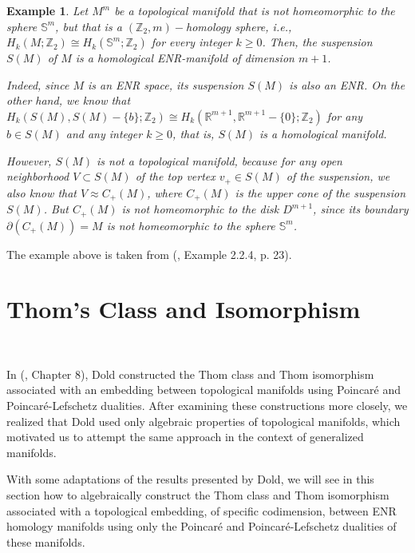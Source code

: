\documentclass[12pt,oneside]{book}
\newtheorem{ex}     {Example}[chapter]
\newcommand{\R}{\mathbb{R}}
\newcommand{\Z}{\mathbb{Z}}
\begin{document}
    \begin{ex}
        Let $M^{m}$ be a topological manifold that is not homeomorphic to the sphere $\mathbb{S}^{m}$, but that is a $(\Z_{2},m)-$homology sphere, 
        i.e., $H_{k}(M;\Z_{2})\cong H_{k}(\mathbb{S}^{m};\Z_{2})$ for every integer $k\geq 0$. Then, the suspension $S(M)$ of $M$ is a homological 
        ENR-manifold of dimension $m+1$.

        Indeed, since $M$ is an ENR space, its suspension $S(M)$ is also an ENR. On the other hand, we know that 
        $H_{k}(S(M),S(M)-\{b\};\Z_{2})\cong H_{k}(\R^{m+1},\R^{m+1}-\{0\};\Z_{2})$ for any $b\in S(M)$ and any integer $k\geq 0$, that is, $S(M)$ 
        is a homological manifold.

        However, $S(M)$ is not a topological manifold, because for any open neighborhood $V\subset S(M)$ of the top vertex $v_{+}\in S(M)$ of the 
        suspension, we also know that $V\approx C_{+}(M)$, where $C_{+}(M)$ is the upper cone of the suspension $S(M)$. But $C_{+}(M)$ is not 
        homeomorphic to the disk $D^{m+1}$, since its boundary $\partial(C_{+}(M))=M$ is not homeomorphic to the sphere $\mathbb{S}^{m}$.
    \end{ex}

    The example above is taken from (\cite{denise}, Example 2.2.4, p. 23).



    \section{Thom's Class and Isomorphism}\label{sec_thom_gen}

    \

    In (\cite{dold}, Chapter 8), Dold constructed the Thom class and Thom isomorphism associated with an embedding between topological 
    manifolds using Poincaré and Poincaré-Lefschetz dualities. After examining these constructions more closely, we realized that Dold used 
    only algebraic properties of topological manifolds, which motivated us to attempt the same approach in the context of generalized 
    manifolds.

    With some adaptations of the results presented by Dold, we will see in this section how to algebraically construct the Thom 
    class and Thom isomorphism associated with a topological embedding, 
    of specific codimension, between ENR homology manifolds using only the 
    Poincaré and Poincaré-Lefschetz dualities of these manifolds.
\end{document}

